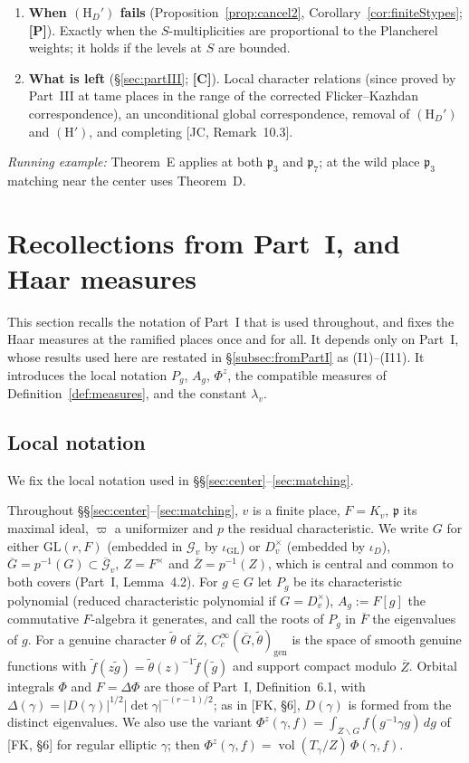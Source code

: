 \documentclass[12pt]{article}
\newcommand{\ov}[1]{\overline{#1}}
\newcommand{\fp}{\mathfrak{p}}
\newcommand{\gen}{\mathrm{gen}}
\newcommand{\vol}{\operatorname{vol}}
\newcommand{\GL}{\mathrm{GL}}
\newcommand{\Gb}{\ov{G}}
\newcommand{\Zb}{\ov{Z}}
\newcommand{\cG}{\mathcal{G}}
\newcommand{\cGb}{\ov{\mathcal{G}}}
\newcommand{\iD}{\iota_D}
\newcommand{\iG}{\iota_{\GL}}
\newcommand{\Pv}{\textbf{[P]}}
\newcommand{\Cv}{\textbf{[C]}}
\theoremstyle{plain}
\theoremstyle{definition}
\begin{document}
\begin{enumerate}[leftmargin=*,label=\arabic*.]
\item \textbf{When $(\mathrm H_D')$ fails} (Proposition~\ref{prop:cancel2}, Corollary~\ref{cor:finiteStypes}; \Pv). Exactly when the $S$-multiplicities are proportional to the Plancherel weights; it holds if the levels at $S$ are bounded.
\item \textbf{What is left} (\S\ref{sec:partIII}; \Cv). Local character relations (since proved by Part~III at tame places in the range of the corrected Flicker--Kazhdan correspondence), an unconditional global correspondence, removal of $(\mathrm H_D')$ and $(\mathrm H')$, and completing [JC, Remark~10.3].
\end{enumerate}
\emph{Running example:} Theorem~E applies at both $\mathfrak p_3$ and $\mathfrak p_7$; at the wild place $\mathfrak p_3$ matching near the center uses Theorem~D.

\section{Recollections from Part~I, and Haar measures}\label{sec:recall}
This section recalls the notation of Part~I that is used throughout, and fixes the Haar measures at the ramified places once and for all. It depends only on Part~I, whose results used here are restated in \S\ref{subsec:fromPartI} as (I1)--(I11). It introduces the local notation $P_g$, $A_g$, $\Phi^z$, the compatible measures of Definition~\ref{def:measures}, and the constant $\lambda_v$.

\subsection{Local notation}\label{subsec:localnotation}
We fix the local notation used in \S\S\ref{sec:center}--\ref{sec:matching}.

Throughout \S\S\ref{sec:center}--\ref{sec:matching}, $v$ is a finite place, $F=K_v$, $\fp$ its maximal ideal, $\varpi$ a uniformizer and $p$ the residual characteristic. We write $G$ for either $\GL(r,F)$ (embedded in $\cG_v$ by $\iG$) or $D_v^\times$ (embedded by $\iD$), $\Gb=p^{-1}(G)\subset\cGb_v$, $Z=F^\times$ and $\Zb=p^{-1}(Z)$, which is central and common to both covers (Part~I, Lemma~4.2). For $g\in G$ let $P_g$ be its characteristic polynomial (reduced characteristic polynomial if $G=D_v^\times$), $A_g:=F[g]$ the commutative $F$-algebra it generates, and call the roots of $P_g$ in $\ov F$ the eigenvalues of $g$. For a genuine character $\tilde\theta$ of $\Zb$, $C_c^\infty(\Gb,\tilde\theta)_\gen$ is the space of smooth genuine functions with $\tilde f(z\tilde g)=\tilde\theta(z)^{-1}\tilde f(\tilde g)$ and support compact modulo $\Zb$. Orbital integrals $\Phi$ and $F=\Delta\Phi$ are those of Part~I, Definition~6.1, with $\Delta(\gamma)=|D(\gamma)|^{1/2}|\det\gamma|^{-(r-1)/2}$; as in [FK, \S6], $D(\gamma)$ is formed from the distinct eigenvalues. We also use the variant $\Phi^z(\gamma,f)=\int_{Z\backslash G}f(g^{-1}\gamma g)\,dg$ of [FK, \S6] for regular elliptic $\gamma$; then $\Phi^z(\gamma,f)=\vol(T_\gamma/Z)\,\Phi(\gamma,f)$.
\end{document}
